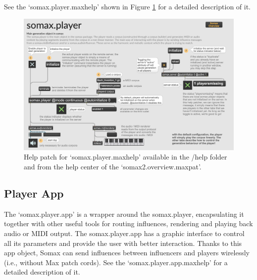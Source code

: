 See the `somax.player.maxhelp' shown in Figure \ref{fig:player_help} for a detailed description of it.

\begin{figure}[H]
    \centering        
 	\includegraphics[width=1\textwidth, keepaspectratio]{img/player_help.png}
    \caption{Help patch for `somax.player.maxhelp' available in the /help folder and from the help center of the `somax2.overview.maxpat'.}
    \label{fig:player_help}
\end{figure}

\subsection{Player App}

The `somax.player.app' is a wrapper around the somax.player, encapsulating it together with other useful tools for routing influences, rendering and playing back audio or MIDI output. The somax.player.app has a graphic interface to control all its parameters and provide the user with better interaction. Thanks to this app object, Somax can send influences between influencers and players wirelessly (i.e., without Max patch cords). See the `somax.player.app.maxhelp' for a detailed description of it.

